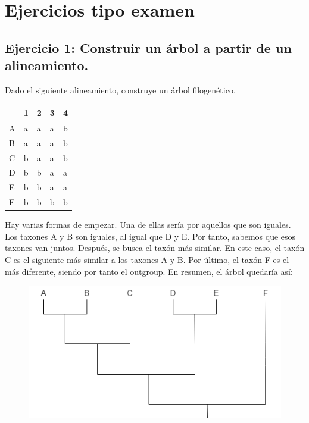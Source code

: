 \chapter{Ejercicios tipo examen}
\section{Ejercicio 1: Construir un árbol a partir de un alineamiento.}
Dado el siguiente alineamiento, construye un árbol filogenético. 
\begin{table}[h]
\centering
\begin{tabular}{l | l l l l }
\hline
& 1 & 2 & 3 & 4 \\
\hline
A & a & a & a & b\\
B & a & a & a & b \\
C & b & a & a & b \\
D & b & b & a & a \\
E & b & b & a & a \\
F & b & b & b & b
\end{tabular}
\end{table}

Hay varias formas de empezar. Una de ellas sería por aquellos que son iguales. Los taxones A y B son iguales, al igual que D y E. Por tanto, sabemos que esos taxones van juntos. Después, se busca el taxón más similar. En este caso, el taxón C es el siguiente más similar a los taxones A y B. Por último, el taxón F es el más diferente, siendo por tanto el outgroup. En resumen, el árbol quedaría así:

\begin{figure}[htbp]
\centering
\includegraphics[width=0.7\linewidth]{figs/phylotree1.drawio.png}
\end{figure}

